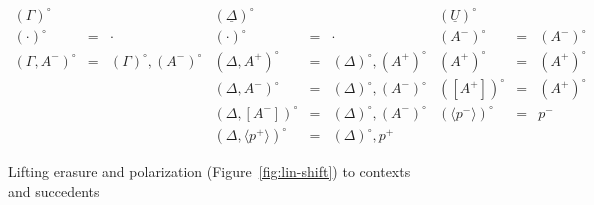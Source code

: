 \begin{figure}
{\small \[
\begin{array}{rcl|rcl|rcl}
{(\Gamma)^\circ} & & &
{(\underline{\Delta})^\circ} & & &
{(\underline{U})^\circ} & & 
\\
(\cdot)^\circ & \!\!\!=\!\!\! & \cdot &
(\cdot)^\circ & \!\!\!=\!\!\! & \cdot &
(A^-)^\circ & \!\!\!=\!\!\! & (A^-)^\circ
\\
(\Gamma, A^-)^\circ & \!\!\!=\!\!\! & (\Gamma)^\circ, (A^-)^\circ &
(\Delta, A^+)^\circ & \!\!\!=\!\!\! & (\Delta)^\circ, (A^+)^\circ &
(A^+)^\circ & \!\!\!=\!\!\! & (A^+)^\circ
\\
& & & 
(\Delta, A^-)^\circ & \!\!\!=\!\!\! & (\Delta)^\circ, (A^-)^\circ &
([A^+])^\circ & \!\!\!=\!\!\! & (A^+)^\circ 
\\
& & &
(\Delta, [ A^- ])^\circ & \!\!\!=\!\!\! & (\Delta)^\circ, (A^-)^\circ & 
(\langle p^- \rangle)^\circ & \!\!\!=\!\!\! & p^-
\\
& & &
(\Delta, \langle p^+ \rangle)^\circ & \!\!\!=\!\!\! & (\Delta)^\circ, p^+ & 
& &
\end{array}\]}
\caption{Lifting erasure and polarization (Figure~\ref{fig:lin-shift}) to
contexts and succedents}
\label{fig:lin-shift-ctx}
\end{figure}
